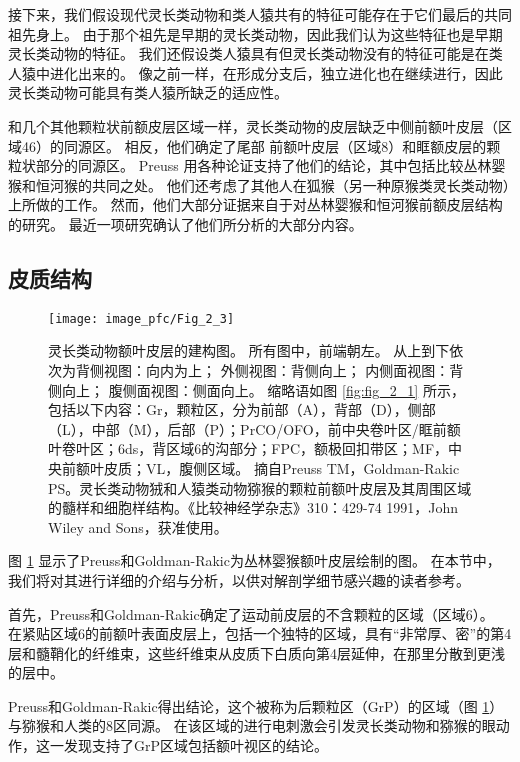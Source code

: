 接下来，我们假设现代灵长类动物和类人猿共有的特征可能存在于它们最后的共同祖先身上。
由于那个祖先是早期的灵长类动物，因此我们认为这些特征也是早期灵长类动物的特征。
我们还假设类人猿具有但灵长类动物没有的特征可能是在类人猿中进化出来的。
像之前一样，在形成分支后，独立进化也在继续进行，因此灵长类动物可能具有类人猿所缺乏的适应性。


和几个其他颗粒状前额皮层区域一样\cite{Preuss1991a}，灵长类动物的皮层缺乏中侧前额叶皮层（区域46）的同源区。
相反，他们确定了尾部 前额叶皮层（区域8）和眶额皮层的颗粒状部分的同源区。
Preuss 用各种论证支持了他们的结论，其中包括比较丛林婴猴和恒河猴的共同之处\cite{preuss1991ipsilateral}。
他们还考虑了其他人在狐猴（另一种原猴类灵长类动物）上所做的工作。
然而，他们大部分证据来自于对丛林婴猴和恒河猴前额皮层结构的研究。
最近一项研究确认了他们所分析的大部分内容\cite{wong2010architectonic}。


\subsection{皮质结构}

\begin{figure}[!htb]
	\centering
	\texttt{[image: image\_pfc/Fig\_2\_3]}
	\caption{灵长类动物额叶皮层的建构图。
		所有图中，前端朝左。
		从上到下依次为背侧视图：向内为上；
		外侧视图：背侧向上；
		内侧面视图：背侧向上；
		腹侧面视图：侧面向上。
		缩略语如图 \ref{fig:fig_2_1} 所示，包括以下内容：Gr，颗粒区，分为前部（A），背部（D），侧部（L），中部（M），后部（P）；PrCO/OFO，前中央卷叶区/眶前额叶卷叶区；6ds，背区域6的沟部分；FPC，额极回扣带区；MF，中央前额叶皮质；VL，腹侧区域。
		摘自Preuss TM，Goldman-Rakic PS。灵长类动物狨和人猿类动物猕猴的颗粒前额叶皮层及其周围区域的髓样和细胞样结构。《比较神经学杂志》310：429-74  1991，John Wiley and Sons，获准使用。\label{fig:fig_2_3}}
\end{figure}

图 \ref{fig:fig_2_3} 显示了Preuss和Goldman-Rakic为丛林婴猴额叶皮层绘制的图。
在本节中，我们将对其进行详细的介绍与分析，以供对解剖学细节感兴趣的读者参考。


首先，Preuss和Goldman-Rakic确定了运动前皮层的不含颗粒的区域（区域6）。
在紧贴区域6的前额叶表面皮层上，包括一个独特的区域，具有“非常厚、密”的第4层和髓鞘化的纤维束，这些纤维束从皮质下白质向第4层延伸，在那里分散到更浅的层中。


Preuss和Goldman-Rakic得出结论，这个被称为后颗粒区（GrP）的区域（图 \ref{fig:fig_2_3}）与猕猴和人类的8区同源。
在该区域的进行电刺激会引发灵长类动物\cite{wu2000converging}和猕猴\cite{bruce1985primate}的眼动作，这一发现支持了GrP区域包括额叶视区的结论。


